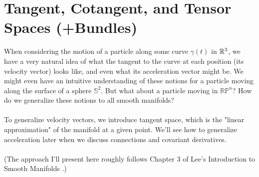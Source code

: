 \documentclass[11pt]{article}
\begin{document}
\subsection{}


\newpage
\section{Tangent, Cotangent, and Tensor Spaces (+Bundles)}
When considering the motion of a particle along some curve $\gamma(t)$ in $\mathbb{R}^3$, we have a very natural idea of what the tangent to the curve at each position (its velocity vector) looks like, and even what its acceleration vector might be. We might even have an intuitive understanding of these notions for a particle moving along the surface of a sphere $\mathbb{S}^2$. But what about a particle moving in $\mathbb{RP}^n$? How do we generalize these notions to all smooth manifolds? 
\\
\\
To generalize velocity vectors, we introduce tangent space, which is the "linear approximation" of the manifold at a given point. We'll see how to generalize acceleration later when we discuss connections and covariant derivatives.
\\
\\
(The approach I'll present here roughly follows Chapter 3 of Lee's Introduction to Smooth Manifolds \cite{LeeSM}.)
\\
\end{document}

